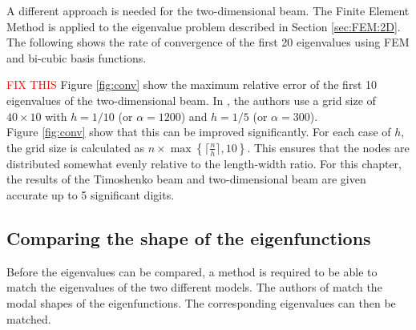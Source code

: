 \documentclass[../../main.tex]{subfiles}
\begin{document}
A different approach is needed for the two-dimensional beam. The Finite Element Method is applied to the eigenvalue problem described in Section \ref{sec:FEM:2D}. The following shows the rate of convergence of the first 20 eigenvalues using FEM and bi-cubic basis functions.

\begin{figure}[H]
	\begin{center}
	\end{center}	
\end{figure}
\textcolor{red}{FIX THIS}
Figure \ref{fig:conv} show the maximum relative error of the first 10 eigenvalues of the two-dimensional beam. In \cite{LVV09}, the authors use a grid size of $40 \times 10$ with $h= 1/10$ (or $\alpha = 1200$) and $h = 1/5$ (or $\alpha = 300$).\\

 Figure \ref{fig:conv} show that this can be improved significantly. For each case of $h$, the grid size is calculated as $n \times \max\left\{\lceil\frac{n}{h}\rceil,10\right\}$. This ensures that the nodes are distributed somewhat evenly relative to the length-width ratio. For this chapter, the results of the Timoshenko beam and two-dimensional beam are given accurate up to 5 significant digits.

\subsection{Comparing the shape of the eigenfunctions}
Before the eigenvalues can be compared, a method is required to be able to match the eigenvalues of the two different models. The authors of \cite{LVV09} match the modal shapes of the eigenfunctions. The corresponding eigenvalues can then be matched.\\
\end{document}
